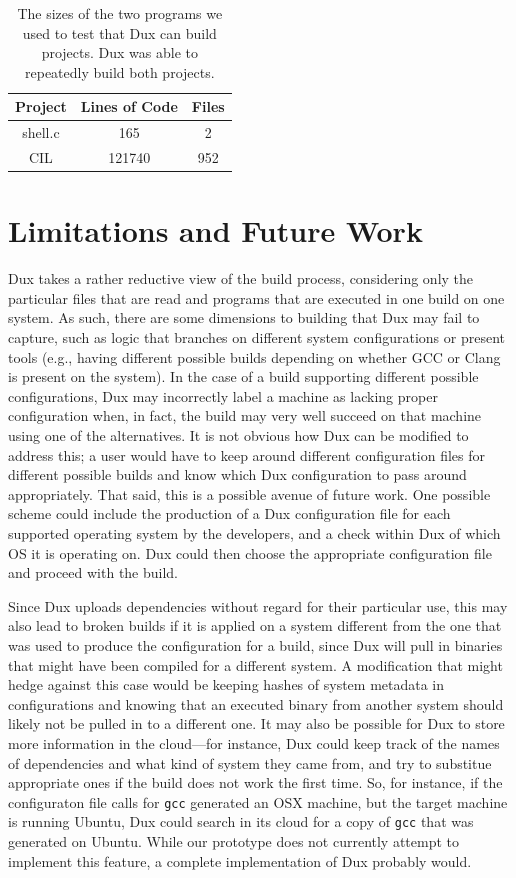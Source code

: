 \documentclass[10pt,conference]{IEEEtran}
\begin{document}
\begin{table}
\begin{center}
\begin{tabular}{ |c|c|c| }
 \hline
 Project & Lines of Code & Files \\ \hline \hline
 shell.c & 165 & 2 \\ \hline
 CIL & 121740 & 952 \\
 \hline
\end{tabular}
\caption{The sizes of the two programs we used to test that Dux can build projects. Dux was able to repeatedly
build both projects.}
\end{center}
\end{table}

\section{Limitations and Future Work}

Dux takes a rather reductive view of the build process, considering only the particular files that are read
and programs that are executed in one build on one system. As such, there are some dimensions to building that
Dux may fail to capture, such as logic that branches on different system configurations or present tools (e.g.,
having different possible builds depending on whether GCC or Clang is present on the system). In the case of
a build supporting different possible configurations, Dux may incorrectly label a machine as lacking proper
configuration when, in fact, the build may very well succeed on that machine using one of the alternatives. 
It is not obvious how Dux can be modified to address this; a user would have to keep around different configuration 
files for different possible builds and know which Dux configuration to pass around appropriately. That said, this 
is a possible avenue of future work. One possible scheme could include the production of a Dux configuration 
file for each supported operating system by the developers, and a check within Dux of which OS it is operating 
on. Dux could then choose the appropriate configuration file and proceed with the build.

Since Dux uploads dependencies without regard for their particular use, this may also lead to broken builds 
if it is applied on a system different from the one that was used to produce the configuration for a build, 
since Dux will pull in binaries that might have been compiled for a different system. A modification that
might hedge against this case would be keeping hashes of system metadata in configurations and knowing
that an executed binary from another system should likely not be pulled in to a different one. It may also
be possible for Dux to store more information in the cloud---for instance, Dux could keep track of the names
of dependencies and what kind of system they came from, and try to substitue appropriate ones if the build does
not work the first time. So, for instance, if the configuraton file calls for \texttt{gcc} generated an OSX machine,
but the target machine is running Ubuntu, Dux could search in its cloud for a copy of \texttt{gcc} that was
generated on Ubuntu. While our prototype does not currently attempt to implement this feature, a complete
implementation of Dux probably would.
\end{document}
